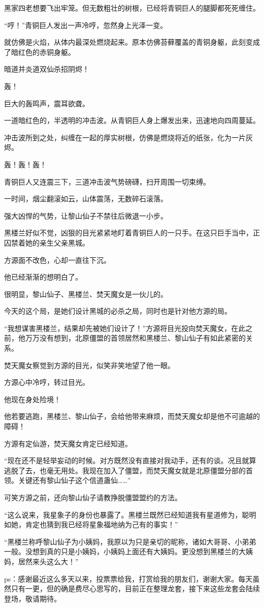 \begin{this_body}
黑家四老想要飞出牢笼。但无数粗壮的树根，已经将青铜巨人的腿脚都死死缠住。

“哼！”青铜巨人发出一声冷哼，忽然身上光泽一变。

就仿佛是火焰，从体内最深处燃烧起来。原本仿佛苔藓覆盖的青铜身躯，此刻变成了暗红色的赤铜身躯。

暗道并炎道双仙杀招阴烬！

轰！

巨大的轰鸣声，震耳欲聋。

一道暗红色的，半透明的冲击波。从青铜巨人身上爆发出来，迅速地向四周蔓延。

冲击波所到之处，纠缠在一起的厚实树根，仿佛是燃烧将近的纸张，化为一片灰烬。

轰！轰！轰！

青铜巨人又连震三下，三道冲击波气势磅礴，扫开周围一切束缚。

一时间，烟尘翻滚如云，山体震荡，无数碎石滚落。

强大凶悍的气势，让黎山仙子不禁往后微退一小步。

黑楼兰好似不觉，凶狠的目光紧紧地盯着青铜巨人的一只手。在这只巨手当中，正囚禁着她的亲生父亲黑城。

方源面不改色，心却一直往下沉。

他已经渐渐的想明白了。

很明显，黎山仙子、黑楼兰、焚天魔女是一伙儿的。

今天的这个局，是她们设计黑城的必杀之局，同时也是针对他方源的局。

“我想谋害黑楼兰，结果却先被她们设计了！”方源将目光投向焚天魔女，在此之前，他万万没有想到，北原僵盟的首领居然和黑楼兰、黎山仙子有如此紧密的关系。

焚天魔女察觉到方源的目光，似笑非笑地望了他一眼。

方源心中冷哼，转过目光。

他现在身处险境！

他若要逃跑，黑楼兰、黎山仙子，会给他带来麻烦，而焚天魔女却是他不可逾越的障碍！

方源有定仙游，焚天魔女肯定已经知道。

“现在还不是轻举妄动的时候。对方既然没有直接对我动手，还有的谈。况且就算逃脱了去，也毫无用处。我现在加入了僵盟，而焚天魔女就是北原僵盟分部的首领。关键还有黎山仙子这个信道蛊仙……”

可笑方源之前，还向黎山仙子请教挣脱僵盟盟约的方法。

“这么说来，我星象子的身份也暴露了。黑楼兰既然已经知道我有星道修为，聪明如她，肯定也猜到我已经将星象福地纳为己有的事实！”

“黑楼兰称呼黎山仙子为小姨妈，我原以为只是亲切的昵称，诸如大哥哥、小弟弟一般。没想到真的只是小姨妈，小姨妈上面还有大姨妈。更没想到黑楼兰的大姨妈，居然来头这么大！”

ps：感谢最近这么多天以来，投票票给我，打赏给我的朋友们，谢谢大家。每天虽然只有一更，但的确是费尽心思写的，目前正在整理龙套，接下来这些龙套会陆续登场，敬请期待。

\end{this_body}

